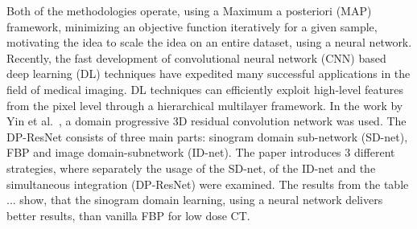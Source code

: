 \documentclass[12pt,a4paper]{article}
\begin{document}
\newline\newline
Both of the methodologies operate, using a Maximum a posteriori (MAP) framework, minimizing an objective function iteratively for a given sample, motivating the idea to scale the idea on an entire dataset, using a neural network. Recently, the fast development of convolutional neural network (CNN) based deep learning (DL) techniques have expedited many successful applications in the field of medical imaging. DL techniques can efficiently exploit high-level features from the pixel level through a hierarchical multilayer framework. In the work by Yin et al.~\cite{Yin2021}, a domain progressive 3D residual convolution network was used. The DP-ResNet consists of three main parts: sinogram domain sub-network (SD-net), FBP and image domain-subnetwork (ID-net). The paper introduces 3 different strategies, where separately the usage of the SD-net, of the ID-net and the simultaneous integration (DP-ResNet) were examined. The results from the table ... show, that the sinogram domain learning, using a neural network delivers better results, than vanilla FBP for low dose CT.
\end{document}
